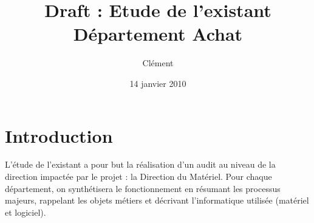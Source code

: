 \documentclass[a4paper]{article}
\title{Draft : Etude de l'existant\\Département Achat}
\author{Clément}
\date{14 janvier 2010}
\begin{document}
\maketitle

\section{Introduction}

L'étude de l'existant a pour but la réalisation d'un audit au niveau de la
direction impactée par le projet : la Direction du Matériel. Pour chaque
département, on synthétisera le fonctionnement en résumant les processus
majeurs, rappelant les objets métiers et décrivant l'informatique utilisée
(matériel et logiciel).
\end{document}
